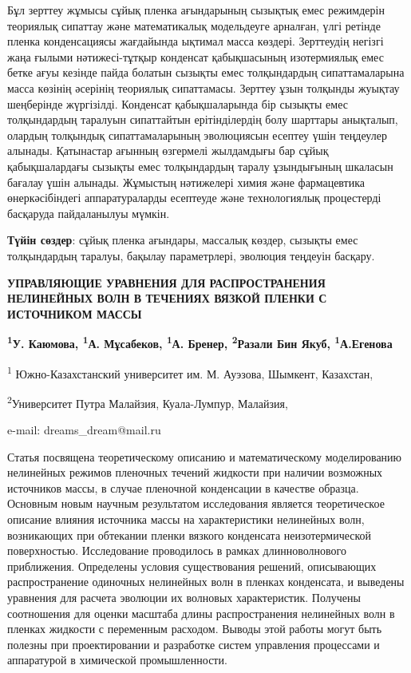 Бұл зерттеу жұмысы сұйық пленка ағындарының сызықтық емес режимдерін
теориялық сипаттау және математикалық модельдеуге арналған, үлгі ретінде
пленка конденсациясы жағдайында ықтимал масса көздері. Зерттеудің
негізгі жаңа ғылыми нәтижесі-тұтқыр конденсат қабықшасының изотермиялық
емес бетке ағуы кезінде пайда болатын сызықты емес толқындардың
сипаттамаларына масса көзінің әсерінің теориялық сипаттамасы. Зерттеу
ұзын толқынды жуықтау шеңберінде жүргізілді. Конденсат қабықшаларында
бір сызықты емес толқындардың таралуын сипаттайтын ерітінділердің болу
шарттары анықталып, олардың толқындық сипаттамаларының эволюциясын
есептеу үшін теңдеулер алынады. Қатынастар ағынның өзгермелі жылдамдығы
бар сұйық қабықшалардағы сызықты емес толқындардың таралу ұзындығының
шкаласын бағалау үшін алынады. Жұмыстың нәтижелері химия және
фармацевтика өнеркәсібіндегі аппаратураларды есептеуде және
технологиялық процестерді басқаруда пайдаланылуы мүмкін.

{\bfseries Түйін сөздер}: сұйық пленка ағындары, массалық көздер, сызықты
емес толқындардың таралуы, бақылау параметрлері, эволюция теңдеуін
басқару.

\begin{articleheader}
{\bfseries УПРАВЛЯЮЩИЕ УРАВНЕНИЯ ДЛЯ РАСПРОСТРАНЕНИЯ НЕЛИНЕЙНЫХ ВОЛН В
ТЕЧЕНИЯХ ВЯЗКОЙ ПЛЕНКИ С ИСТОЧНИКОМ МАССЫ}

{\bfseries \textsuperscript{1}У. Каюмова\textsuperscript{\envelope },
\textsuperscript{1}А. Мұсабеков, \textsuperscript{1}А. Бренер,
\textsuperscript{2}Разали Бин Якуб, \textsuperscript{1}А.Егенова}
\end{articleheader}

\begin{affiliation}
\textsuperscript{1} Южно-Казахстанский университет им. М. Ауэзова, Шымкент, Казахстан,

\textsuperscript{2}Университет Путра Малайзия, Куала-Лумпур, Малайзия,

e-mail: dreams\_dream@mail.ru
\end{affiliation}

Статья посвящена теоретическому описанию и математическому моделированию
нелинейных режимов пленочных течений жидкости при наличии возможных
источников массы, в случае пленочной конденсации в качестве образца.
Основным новым научным результатом исследования является теоретическое
описание влияния источника массы на характеристики нелинейных волн,
возникающих при обтекании пленки вязкого конденсата неизотермической
поверхностью. Исследование проводилось в рамках длинноволнового
приближения. Определены условия существования решений, описывающих
распространение одиночных нелинейных волн в пленках конденсата, и
выведены уравнения для расчета эволюции их волновых характеристик.
Получены соотношения для оценки масштаба длины распространения
нелинейных волн в пленках жидкости с переменным расходом. Выводы этой
работы могут быть полезны при проектировании и разработке систем
управления процессами и аппаратурой в химической промышленности.

